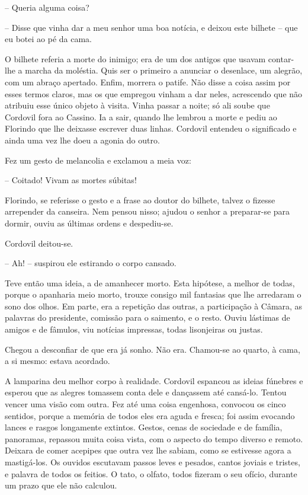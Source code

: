 -- Queria alguma coisa?

-- Disse que vinha dar a meu senhor uma boa notícia, e deixou este
bilhete -- que eu botei ao pé da cama.

O bilhete referia a morte do inimigo; era de um dos antigos que usavam
contar-lhe a marcha da moléstia. Quis ser o primeiro a anunciar o
desenlace, um alegrão, com um abraço apertado. Enfim, morrera o patife.
Não disse a coisa assim por esses termos claros, mas os que empregou
vinham a dar neles, acrescendo que não atribuiu esse único objeto à
visita. Vinha passar a noite; só ali soube que Cordovil fora ao Cassino.
Ia a sair, quando lhe lembrou a morte e pediu ao Florindo que lhe
deixasse escrever duas linhas. Cordovil entendeu o significado e ainda
uma vez lhe doeu a agonia do outro.

Fez um gesto de melancolia e exclamou a meia voz:

-- Coitado! Vivam as mortes súbitas!

Florindo, se referisse o gesto e a frase ao doutor do bilhete, talvez o
fizesse arrepender da canseira. Nem pensou nisso; ajudou o senhor a
preparar-se para dormir, ouviu as últimas ordens e despediu-se.

Cordovil deitou-se.

-- Ah! -- suspirou ele estirando o corpo cansado.

Teve então uma ideia, a de amanhecer morto. Esta hipótese, a melhor de
todas, porque o apanharia meio morto, trouxe consigo mil fantasias que
lhe arredaram o sono dos olhos. Em parte, era a repetição das outras, a
participação à Câmara, as palavras do presidente, comissão para o
saimento, e o resto. Ouviu lástimas de amigos e de fâmulos, viu notícias
impressas, todas lisonjeiras ou justas.

Chegou a desconfiar de que era já sonho. Não era. Chamou-se ao quarto, à
cama, a si mesmo: estava acordado.

A lamparina deu melhor corpo à realidade. Cordovil espancou as ideias
fúnebres e esperou que as alegres tomassem conta dele e dançassem até
cansá-lo. Tentou vencer uma visão com outra. Fez até uma coisa
engenhosa, convocou os cinco sentidos, porque a memória de todos eles
era aguda e fresca; foi assim evocando lances e rasgos longamente
extintos. Gestos, cenas de sociedade e de família, panoramas, repassou
muita coisa vista, com o aspecto do tempo diverso e remoto. Deixara de
comer acepipes que outra vez lhe sabiam, como se estivesse agora a
mastigá-los. Os ouvidos escutavam passos leves e pesados, cantos joviais
e tristes, e palavra de todos os feitios. O tato, o olfato, todos
fizeram o seu ofício, durante um prazo que ele não calculou.

